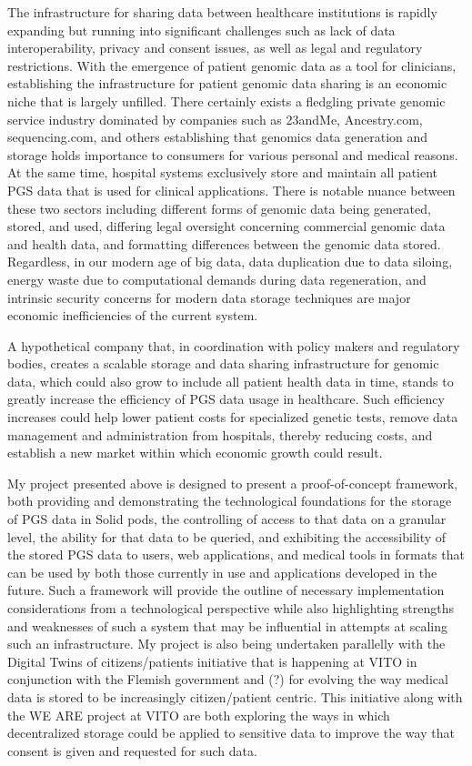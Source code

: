 \documentclass[11pt]{article}
\begin{document}
The infrastructure for sharing data between healthcare institutions is rapidly expanding but running into significant challenges such as lack of data interoperability, privacy and consent issues, as well as legal and regulatory restrictions. 
With the emergence of patient genomic data as a tool for clinicians, establishing the infrastructure for patient genomic data sharing is an economic niche that is largely unfilled. 
There certainly exists a fledgling private genomic service industry dominated by companies such as 23andMe, Ancestry.com, sequencing.com, and others establishing that genomics data generation and storage holds importance to consumers for various personal and medical reasons. 
At the same time, hospital systems exclusively store and maintain all patient PGS data that is used for clinical applications. 
There is notable nuance between these two sectors including different forms of genomic data being generated, stored, and used, differing legal oversight concerning commercial genomic data and health data, and formatting differences between the genomic data stored. 
Regardless, in our modern age of big data, data duplication due to data siloing, energy waste due to computational demands during data regeneration, and intrinsic security concerns for modern data storage techniques are major economic inefficiencies of the current system. 

A hypothetical company that, in coordination with policy makers and regulatory bodies, creates a scalable storage and data sharing infrastructure for genomic data, which could also grow to include all patient health data in time, stands to greatly increase the efficiency of PGS data usage in healthcare. 
Such efficiency increases could help lower patient costs for specialized genetic tests, remove data management and administration from hospitals, thereby reducing costs, and establish a new market within which economic growth could result. 

My project presented above is designed to present a proof-of-concept framework, both providing and demonstrating the technological foundations for the storage of PGS data in Solid pods, the controlling of access to that data on a granular level, the ability for that data to be queried, and exhibiting the accessibility of the stored PGS data to users, web applications, and medical tools in formats that can be used by both those currently in use and applications developed in the future. 
Such a framework will provide the outline of necessary implementation considerations from a technological perspective while also highlighting strengths and weaknesses of such a system that may be influential in attempts at scaling such an infrastructure. My project is also being undertaken parallelly with the Digital Twins of citizens/patients initiative that is happening at VITO in conjunction with the Flemish government and (?) for evolving the way medical data is stored to be increasingly citizen/patient centric. 
This initiative along with the WE ARE project at VITO are both exploring the ways in which decentralized storage could be applied to sensitive data to improve the way that consent is given and requested for such data. 
\end{document}
